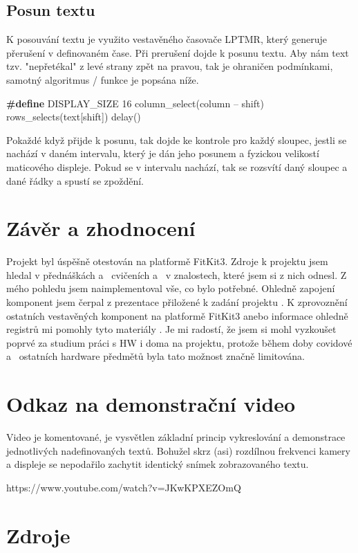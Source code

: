 \documentclass[a4paper, 11pt]{article}
\begin{document}
\subsection{Posun textu}
K posouvání textu je využito vestavěného časovače LPTMR, který generuje přerušení v definovaném čase. Při prerušení dojde k posunu textu. Aby nám text tzv. "nepřetékal" z levé strany zpět na pravou, tak je ohraničen podmínkami, samotný algoritmus / funkce je popsána níže. \\
\hline \vspace{00.5cm}
\begin{algorithmic}
    \STATE \textbf{\#define} DISPLAY\_SIZE 16
    {
        \STATE column\_select(column -- shift)
        \STATE rows\_selects(text[shift])
        \STATE delay()
      \ENDIF}    
\end{algorithmic}
\vspace{00.5cm}
\hline
\vspace{00.5cm}
\noindent Pokaždé když přijde k posunu, tak dojde ke kontrole pro každý sloupec, jestli se nachází v daném intervalu, který je dán jeho posunem a fyzickou velikostí maticového displeje. Pokud se v intervalu nachází, tak se rozsvítí daný sloupec a dané řádky a spustí se zpoždění.

\section{Závěr a zhodnocení}
Projekt byl úspěšně otestován na platformě FitKit3. Zdroje k projektu jsem hledal v přednáškách a~ cvičeních a~ v znalostech, které jsem si z nich odnesl. Z mého pohledu jsem naimplementoval vše, co bylo potřebné.
Ohledně zapojení komponent jsem čerpal z prezentace přiložené k zadání projektu \cite{prezentace}. K zprovoznění ostatních vestavěných komponent na platformě FitKit3 anebo informace ohledně registrů mi pomohly tyto materiály \cite{schemafitkit} \cite{k60_manual}.
Je mi radostí, že jsem si mohl vyzkoušet poprvé za studium práci s HW i doma na projektu, protože během doby covidové a~ ostatních hardware předmětů byla tato možnost značně limitována.

\section{Odkaz na demonstrační video}
Video je komentované, je vysvětlen základní princip vykreslování a demonstrace jednotlivých nadefinovaných textů.
Bohužel skrz (asi) rozdílnou frekvenci kamery a displeje se nepodařilo zachytit identický snímek zobrazovaného textu. \\ \vspace{00.5cm}

https://www.youtube.com/watch?v=JKwKPXEZOmQ

\section{Zdroje}


\end{document}
